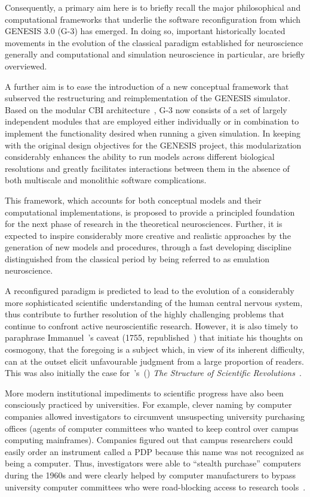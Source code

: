 \documentclass[11pt,3p,twocolumn]{JMN}
\begin{document}
Consequently, a primary aim here is to briefly recall the major philosophical and computational frameworks that underlie the software reconfiguration from which GENESIS 3.0 (G-3) has emerged. In doing so, important historically located movements in the evolution of the classical paradigm established for neuroscience generally and computational and simulation neuroscience in particular, are briefly overviewed.

A further aim is to ease the introduction of a new conceptual framework that subserved the restructuring and reimplementation of the GENESIS simulator. Based on the modular CBI architecture~\citep{cornelis12}, G-3 now consists of a set of largely independent modules that are employed either individually or in combination to implement the functionality desired when running a given simulation. In keeping with the original design objectives for the GENESIS project, this modularization considerably enhances the ability to run models across different biological resolutions and greatly facilitates interactions between them in the absence of both multiscale and monolithic software complications.

 This framework, which accounts for both conceptual models and their computational implementations, is proposed to provide a principled foundation for the next phase of research in the theoretical neurosciences. Further, it is expected to inspire considerably more creative and realistic approaches by the generation of new models and procedures, through a fast developing discipline distinguished from the classical period by being referred to as emulation neuroscience.

A reconfigured paradigm is predicted to lead to the evolution of a considerably more sophisticated scientific understanding of the human central nervous system, thus contribute to further resolution of the highly challenging problems that continue to confront active neuroscientific research. However, it is also timely to paraphrase Immanuel~\citeauthor{kant08}'s caveat (1755, republished~\citeyear{kant08}) that initiate his thoughts on cosmogony, that the foregoing is a subject which, in view of its inherent difficulty, can at the outset elicit unfavourable judgment from a large proportion of readers. This was also initially the case for~\citeauthor{kuhn96}'s~(\citeyear{kuhn96}) {\it The Structure of Scientific Revolutions}~\citep[see][]{bird22}.

More modern institutional impediments to scientific progress have also been consciously practiced by universities. For example, clever naming by computer companies allowed investigators to circumvent unsuspecting university purchasing offices (agents of computer committees who wanted to keep control over campus computing mainframes). Companies figured out that campus researchers could easily order an instrument called a PDP because this name was not recognized as being a computer. Thus, investigators were able to “stealth purchase” computers during the 1960s and were clearly helped by computer manufacturers to bypass university computer committees who were road-blocking access to research tools~\citep{Moore:2010vn}. 
\end{document}
